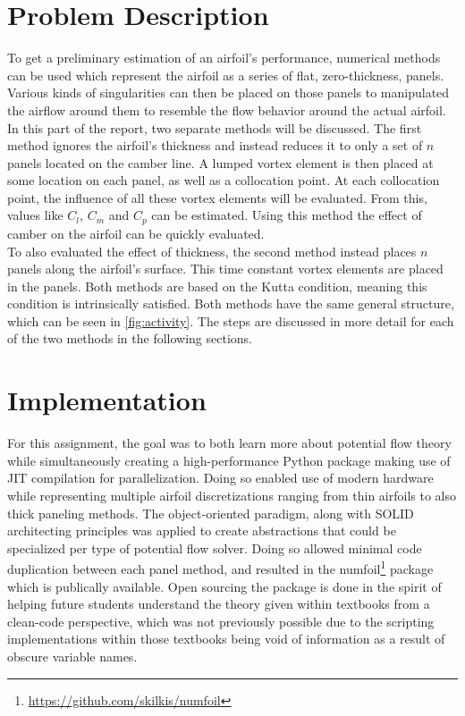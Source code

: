 \newcommand{\numfoil}{\textsf{numfoil}}
\newcommand{\xfoil}{\textsf{XFOIL}\ }
\chapter{Problem Description}
To get a preliminary estimation of an airfoil's performance, numerical methods
can be used which represent the airfoil as a series of flat, zero-thickness,
panels. Various kinds of singularities can then be placed on those panels to
manipulated the airflow around them to resemble the flow behavior around the
actual airfoil.\\

In this part of the report, two separate methods will be discussed.
The first method ignores the airfoil's thickness and instead reduces it to only
a set of $n$ panels located on the camber line. A lumped vortex element is then
placed at some location on each panel, as well as a collocation point. At each
collocation point, the influence of all these vortex elements will be evaluated.
From this, values like $C_l$, $C_m$ and $C_p$ can be estimated. Using this
method the effect of camber on the airfoil can be quickly evaluated.\\

To also evaluated the effect of thickness, the second method instead places $n$
panels along the airfoil's surface. This time constant vortex elements are
placed in the panels.
Both methods are based on the Kutta condition, meaning this condition is
intrinsically satisfied. Both methods have the same general structure, which can
be seen in \autoref{fig:activity}. The steps are discussed in more detail
for each of the two methods in the following sections.


\chapter{Implementation}
For this assignment, the goal was to both learn more about potential flow
theory while simultaneously creating a high-performance Python package making
use of JIT compilation for parallelization. Doing so enabled use of modern
hardware while representing multiple airfoil discretizations ranging from thin
airfoils to also thick paneling methods. The object-oriented paradigm, along
with SOLID architecting principles was applied to create abstractions that
could be specialized per type of potential flow solver. Doing so allowed
minimal code duplication between each panel method, and resulted in the
\numfoil\footnote{\url{https://github.com/skilkis/numfoil}} package which is
publically available. Open sourcing the package is done in the spirit of
helping future students understand the theory given within textbooks from a
clean-code perspective, which was not previously possible due to the scripting
implementations within those textbooks being void of information as a result of
obscure variable names.\\

